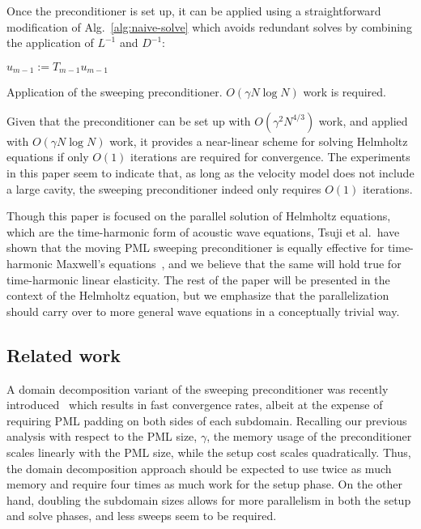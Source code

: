 Once the preconditioner is set up, it can be applied using a straightforward
modification of Alg.~\ref{alg:naive-solve} which avoids 
redundant solves by combining the application of $L^{-1}$ and $D^{-1}$:

\begin{algorithm}
\DontPrintSemicolon
$u_{m-1} := T_{m-1} u_{m-1}$\;
\caption{Application of the sweeping preconditioner. 
$O(\gamma N \log N)$ work is required.}
\label{alg:sweeping-apply}
\end{algorithm}
Given that the preconditioner can be set up with $O(\gamma^2 N^{4/3})$ work, 
and applied with $O(\gamma N \log N)$ work, it provides a near-linear scheme
for solving Helmholtz equations if only $O(1)$ iterations are required for 
convergence. The experiments in this paper seem to indicate that, as long as 
the velocity model does not include a large cavity, the sweeping preconditioner 
indeed only requires $O(1)$ iterations.


Though this paper is focused on the parallel solution of Helmholtz equations,
which are the time-harmonic form of acoustic wave equations, Tsuji et al.\ have
shown that the moving PML sweeping preconditioner is equally effective
for time-harmonic Maxwell's equations~\cite{Tsuji-JCP,Tsuji-JFM}, and we believe
that the same will hold true for time-harmonic linear elasticity. The rest
of the paper will be presented in the context of the Helmholtz equation, but
we emphasize that the parallelization should carry over to more general wave 
equations in a conceptually trivial way. 

\subsection{Related work}
A domain decomposition variant of the sweeping preconditioner was recently
introduced~\cite{Stolk-sweeping} which results in fast convergence rates, 
albeit at the expense of requiring PML padding on both sides of each subdomain.
Recalling our previous analysis with respect to the PML size, 
$\gamma$, the memory usage of the preconditioner scales linearly with the 
PML size, while the setup cost scales quadratically. Thus, the domain 
decomposition approach should be expected to use twice as much memory and 
require four times as much work for the setup phase. 
On the other hand, doubling the subdomain sizes allows for more parallelism 
in both the setup and solve phases, and less sweeps seem to be required.

